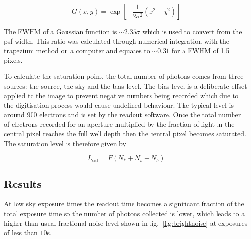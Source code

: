 \documentclass[a4paper]{report}
\begin{document}

\[
G(x,y) = \exp \left[
		-\frac{1}{2\sigma^{2}} \left(
			x^{2} + y^{2}
		\right)
	\right]
\]

The FWHM of a Gaussian function is $\sim 2.35 \sigma$ which is used to
convert from the psf width. This ratio was calculated through numerical
integration with the trapezium method on a computer and equates to $\sim
0.31$ for a FWHM of 1.5 pixels.

To calculate the saturation point, the total number of photons comes
from three sources: the source, the sky and the bias level. The bias
level is a deliberate offset applied to the image to prevent negative
numbers being recorded which due to the digitisation process would cause
undefined behaviour. The typical level is around 900 electrons and is
set by the readout software. Once the total number of electrons recorded
for an aperture multiplied by the fraction of light in the central pixel
reaches the full well depth then the central pixel becomes saturated.
The saturation level is therefore given by

\[
    L_{\mathrm{sat}} = F  (N_{\ast} + N_{s} + N_{b})
    \]



\subsection{Results}

At low sky exposure times the readout time becomes a significant fraction of the total exposure time so the number of photons collected is lower, which leads to a higher than usual fractional noise level shown in fig.~\ref{fig:brightnoise} at exposures of less than $10$s.
\end{document}

